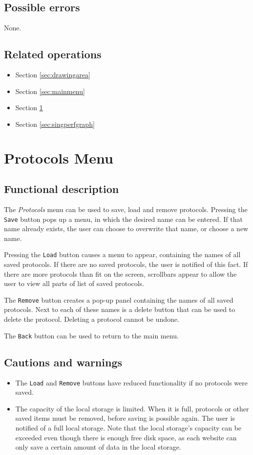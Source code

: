   \subsection*{Possible errors}
  None.

  \subsection*{Related operations}
  \begin{itemize}
    \item Section \ref{sec:drawingarea}
    \item Section \ref{sec:mainmenu}
    \item Section \ref{sec:protmenu}
    \item Section \ref{sec:singperfgraph}
  \end{itemize}

\section{Protocols Menu}\label{sec:protmenu}
  \subsection*{Functional description}
  The \emph{Protocols} menu can be used to save, load and remove protocols. Pressing the \texttt{Save} button pops up a menu, in which the desired name can be entered. If that name already exists, the user can choose to overwrite that name, or choose a new name.
  
  Pressing the \texttt{Load} button causes a menu to appear, containing the names of all saved protocols. If there are no saved protocols, the user is notified of this fact. If there are more protocols than fit on the screen, scrollbars appear to allow the user to view all parts of list of saved protocols.
  
  The \texttt{Remove} button creates a pop-up panel containing the names of all saved protocols. Next to each of these names is a delete button that can be used to delete the protocol. Deleting a protocol cannot be undone.
  
  The \texttt{Back} button can be used to return to the main menu.

  \subsection*{Cautions and warnings}
  \begin{itemize}
    \item The \texttt{Load} and \texttt{Remove} buttons have reduced functionality if no protocols were saved.
    \item The capacity of the local storage is limited. When it is full, protocols or other saved \projectname{} items must be removed, before saving is possible again. The user is notified of a full local storage. Note that the local storage's capacity can be exceeded even though there is enough free disk space, as each website can only save a certain amount of data in the local storage.
  \end{itemize}  

